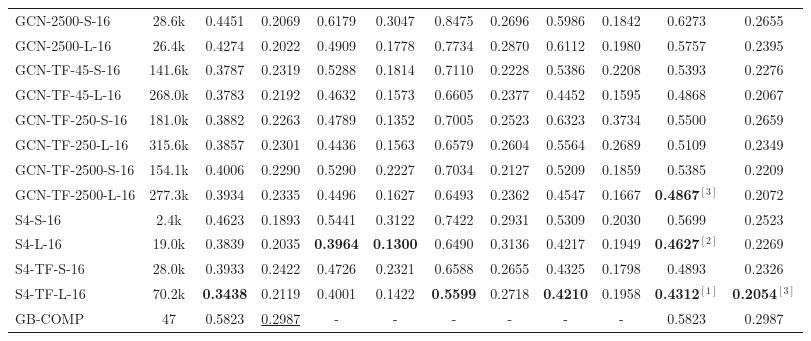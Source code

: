 \begin{table*}[ht!]
{\begin{tabular}{lccc|cc|cc|cc|cc}
            GCN-2500-S-16               
                & 28.6k & 0.4451 & 0.2069 & 0.6179 & 0.3047 & 0.8475 & 0.2696 & 0.5986 & 0.1842 & 0.6273 & 0.2655\\ 
            GCN-2500-L-16               
                & 26.4k & 0.4274 & 0.2022 & 0.4909 & 0.1778 & 0.7734 & 0.2870 & 0.6112 & 0.1980 & 0.5757 & 0.2395\\
            \hline
            GCN-TF-45-S-16               
                & 141.6k & 0.3787 & 0.2319 & 0.5288 & 0.1814 & 0.7110 & 0.2228 & 0.5386	& 0.2208 & 0.5393 & 0.2276\\
            GCN-TF-45-L-16               
                & 268.0k & 0.3783 & 0.2192 & 0.4632 & 0.1573 & 0.6605 & 0.2377 & 0.4452	& 0.1595 & 0.4868 & 0.2067\\
            GCN-TF-250-S-16               
                & 181.0k & 0.3882 & 0.2263 & 0.4789 & 0.1352 & 0.7005 & 0.2523 & 0.6323	& 0.3734 & 0.5500 & 0.2659\\
            GCN-TF-250-L-16               
                & 315.6k & 0.3857 & 0.2301 & 0.4436	& 0.1563 & 0.6579 & 0.2604 & 0.5564	& 0.2689 & 0.5109 & 0.2349\\
            GCN-TF-2500-S-16               
                & 154.1k & 0.4006 & 0.2290 & 0.5290 & 0.2227 & 0.7034 & 0.2127 & 0.5209	& 0.1859 & 0.5385 & 0.2209\\
            GCN-TF-2500-L-16               
                & 277.3k & 0.3934 & 0.2335 & 0.4496	& 0.1627 & 0.6493 & 0.2362 & 0.4547	& 0.1667 & \textbf{0.4867}$^{[3]}$ & 0.2072\\
            \hline
            S4-S-16              
                & 2.4k & 0.4623	& 0.1893 & 0.5441	& 0.3122 & 0.7422 & 0.2931 & 0.5309	& 0.2030 & 0.5699 & 0.2523\\
            S4-L-16              
                & 19.0k & 0.3839 & 0.2035 & \textbf{0.3964} & \textbf{0.1300} & 0.6490 & 0.3136 & 0.4217 & 0.1949 & \textbf{0.4627}$^{[2]}$ & 0.2269\\
            \hline
            S4-TF-S-16              
                & 28.0k & 0.3933 & 0.2422 & 0.4726 & 0.2321 & 0.6588 & 0.2655 & 0.4325 & 0.1798 & 0.4893 & 0.2326\\
            S4-TF-L-16             
                & 70.2k & \textbf{0.3438} & 0.2119 & 0.4001	& 0.1422 & \textbf{0.5599} & 0.2718 & \textbf{0.4210} & 0.1958 & \textbf{0.4312}$^{[1]}$ & \textbf{0.2054}$^{[3]}$\\
            \hline
            GB-COMP
                & 47 & 0.5823 & \underline{0.2987} & - & - & - & - & - & - & 0.5823	& 0.2987\\

\end{tabular}}
\end{table*}
